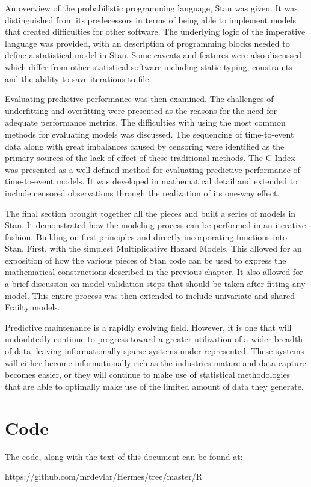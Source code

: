 An overview of the probabilistic programming language, Stan was given. It was distinguished from its predecessors in terms of being able to implement models that created difficulties for other software. The underlying logic of the imperative  language was provided, with an description of programming blocks needed to define a statistical model in Stan. Some caveats and features were also discussed which differ from other statistical software including static typing, constraints and the ability to save iterations to file.

Evaluating predictive performance was then examined. The challenges of underfitting and overfitting were presented as the reasons for the need for adequate performance metrics. The difficulties with using the most common methods for evaluating models was discussed. The sequencing of time-to-event data along with great imbalances caused by censoring were identified as the primary sources of the lack of effect of these traditional methods. The C-Index was presented as a well-defined method for evaluating predictive performance of time-to-event models. It was developed in mathematical detail and extended to include censored observations through the realization of its one-way effect.

The final section brought together all the pieces and built a series of models in Stan. It demonstrated how the modeling process can be performed in an iterative fashion. Building on first principles and directly incorporating functions into Stan. First, with the simplest Multiplicative Hazard Models. This allowed for an exposition of how the various pieces of Stan code can be used to express the mathematical constructions described in the previous chapter. It also allowed for a brief discussion on model validation steps that should be taken after fitting any model. This entire process was then extended to include univariate and shared Frailty models. 

Predictive maintenance is a rapidly evolving field. However, it is one that will undoubtedly continue to progress toward a greater utilization of a wider breadth of data, leaving informationally sparse systems under-represented. These systems will either become informationally rich as the industries mature and data capture becomes easier, or they will continue to make use of statistical methodologies that are able to optimally make use of the limited amount of data they generate.







\section*{Code}


The code, along with the text of this document can be found at:

https://github.com/mrdevlar/Hermes/tree/master/R

